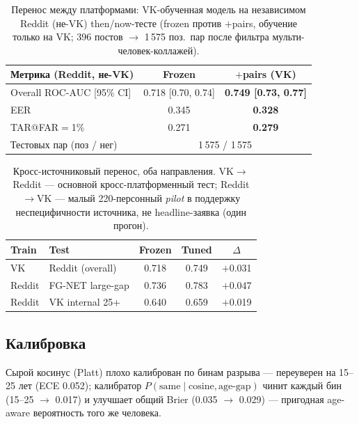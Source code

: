 \documentclass[journal]{IEEEtran}
\begin{document}
\begin{table}[!t]
\renewcommand{\arraystretch}{1.2}
\caption{Перенос между платформами: VK-обученная модель на независимом Reddit (не-VK) then/now-тесте (frozen против $+$pairs, обучение только на VK; 396 постов $\rightarrow$ 1\,575 поз.\ пар после фильтра мульти-человек-коллажей).}
\label{tab:crossplatform}
\centering
\footnotesize
\setlength{\tabcolsep}{4pt}%
\begin{tabular}{@{}lcc@{}}
\toprule
Метрика (Reddit, не-VK) & Frozen & $+$pairs (VK) \\
\midrule
Overall ROC-AUC [95\% CI] & 0.718 [0.70, 0.74] & \textbf{0.749 [0.73, 0.77]} \\
EER & 0.345 & \textbf{0.328} \\
TAR@FAR$=$1\% & 0.271 & \textbf{0.279} \\
\midrule
Тестовых пар (поз / нег) & \multicolumn{2}{c}{1\,575 / 1\,575} \\
\bottomrule
\end{tabular}
\end{table}

\begin{table}[!t]
\renewcommand{\arraystretch}{1.2}
\caption{Кросс-источниковый перенос, оба направления. VK$\to$Reddit --- основной кросс-платформенный тест; Reddit$\to$VK --- малый 220-персонный \emph{pilot} в поддержку неспецифичности источника, не headline-заявка (один прогон).}
\label{tab:crosssource}
\centering
\footnotesize
\begin{tabular}{@{}llccc@{}}
\toprule
Train & Test & Frozen & Tuned & $\Delta$ \\
\midrule
VK & Reddit (overall) & 0.718 & 0.749 & $+$0.031 \\
Reddit & FG-NET large-gap & 0.736 & 0.783 & $+$0.047 \\
Reddit & VK internal 25+ & 0.640 & 0.659 & $+$0.019 \\
\bottomrule
\end{tabular}
\end{table}

\subsection{Калибровка}\label{sec:res-calib}
Сырой косинус (Platt) плохо калиброван по бинам разрыва --- переуверен на 15--25 лет (ECE 0.052); калибратор $P(\text{same}\mid\text{cosine},\text{age-gap})$ чинит каждый бин (15--25 $\rightarrow$ 0.017) и улучшает общий Brier (0.035 $\rightarrow$ 0.029) --- пригодная age-aware вероятность того же человека.
\end{document}
